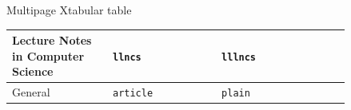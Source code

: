 \documentclass{beamer}
\begin{document}
\begin{frame}{Multipage Xtabular table}
\begin{table}
\begin{xtabular}{
			p{0.25\linewidth}
			p{0.27\linewidth}
			p{0.17\linewidth}
			m{0.15\linewidth}
		}
		Lecture Notes in Computer Science& \Verb|llncs|& \Verb|lllncs|&   \\ \midrule
		General & \Verb|article|  & \Verb|plain|  &  \\ 
		
		\bottomrule
	\end{xtabular}
\end{table}
\end{frame}
\end{document}

